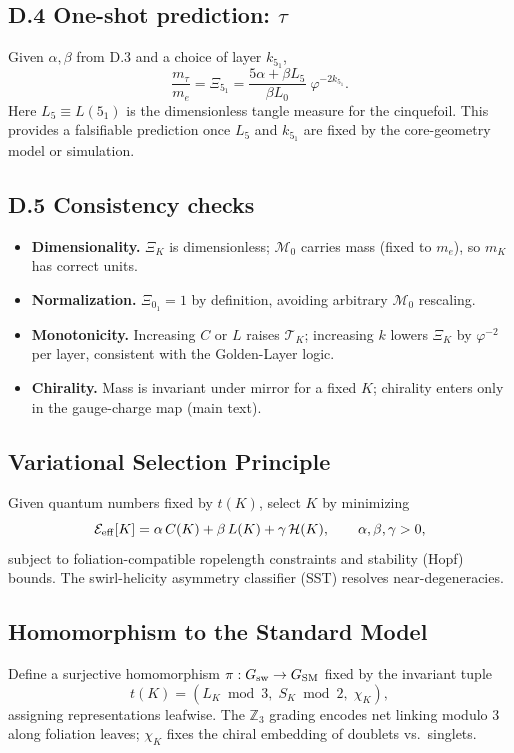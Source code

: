 \documentclass[11pt, preprint,titlepage]{revtex4-2}
\begin{document}
		\subsection*{D.4 One-shot prediction: \texorpdfstring{\(\tau\)}{tau}}
		Given \(\alpha,\beta\) from D.3 and a choice of layer \(k_{5_1}\),
		\[
		\frac{m_\tau}{m_e}
		= \Xi_{5_1}
		= \frac{5\alpha+\beta L_5}{\beta L_0}\;\varphi^{-2k_{5_1}}.
		\]
		Here \(L_5\equiv L(5_1)\) is the dimensionless tangle measure for the cinquefoil.
		This provides a falsifiable prediction once \(L_5\) and \(k_{5_1}\) are fixed by the core-geometry model or simulation.

		\subsection*{D.5 Consistency checks}
		\begin{itemize}
		\item \textbf{Dimensionality.} \(\Xi_K\) is dimensionless; \(\mathcal{M}_0\) carries mass (fixed to \(m_e\)), so \(m_K\) has correct units.
		\item \textbf{Normalization.} \(\Xi_{0_1}=1\) by definition, avoiding arbitrary \(\mathcal{M}_0\) rescaling.
		\item \textbf{Monotonicity.} Increasing \(C\) or \(L\) raises \(\mathcal{T}_K\); increasing \(k\) lowers \(\Xi_K\) by \(\varphi^{-2}\) per layer, consistent with the Golden-Layer logic.
		\item \textbf{Chirality.} Mass is invariant under mirror for a fixed \(K\); chirality enters only in the gauge-charge map (main text).
		\end{itemize}

		\subsection{Variational Selection Principle}
		Given quantum numbers fixed by \(t(K)\), select \(K\) by minimizing
		\begin{equation}
		\mathcal E_{\rm eff}[K]=\alpha\,C(K)+\beta\,L(K)+\gamma\,\mathcal H(K),\qquad \alpha,\beta,\gamma>0,
		\end{equation}
		subject to foliation-compatible ropelength constraints and stability (Hopf) bounds. The swirl-helicity asymmetry classifier (SST) resolves near-degeneracies.


		\subsection{Homomorphism to the Standard Model}
		Define a surjective homomorphism \(\pi:G_{\rm sw}\to G_{\rm SM}\) fixed by the invariant tuple
		\begin{equation}
		t(K)=(L_K\bmod 3,\; S_K\bmod 2,\; \chi_K),
		\end{equation}
		assigning representations leafwise. The \(\mathbb Z_3\) grading encodes net linking modulo 3 along foliation leaves; \(\chi_K\) fixes the chiral embedding of doublets vs.\ singlets.
\end{document}

